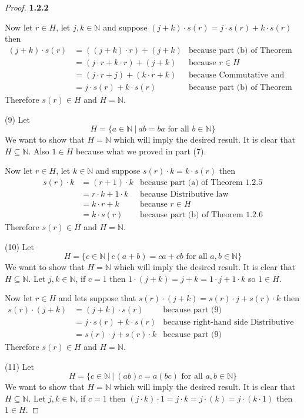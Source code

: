 \documentclass[11pt]{article}
\newcommand{\N}{\mathbb{N}}
\theoremstyle{definition}
\begin{document}
\begin{proof}{\textbf{1.2.2}}
\begin{itemize}
        Now let $r \in H$, let $j,k \in \N$ and suppose
        $(j+k)\cdot s(r) = j\cdot s(r) + k\cdot s(r)$ then
        \begin{align*}
            (j+k)\cdot s(r) &= ((j+k)\cdot r) + (j+k) &\text{because part (b) of Theorem 1.2.6}\\
                &= (j\cdot r + k \cdot r) + (j+k) &\text{because }r \in H\\
                &= (j\cdot r + j) + (k\cdot r + k) &\text{because Commutative and Associative law} \\
                &= j\cdot s(r) + k \cdot s(r) &\text{because part (b) of Theorem 1.2.6}
        \end{align*}
        Therefore $s(r) \in H$ and $H = \N$.
        \end{itemize}
        \item [(9)] Let
        $$H = \{a \in \N ~|~ ab=ba \text{ for all }b \in \N\}$$
        We want to show that $H = \N$ which will imply the desired result. It 
        is clear that $H\subseteq\N$. Also $1 \in H$ because what we proved in
        part (7).

        Now let $r \in H$, let $k \in \N$ and suppose $s(r)\cdot k = k \cdot s(r)$
        then
        \begin{align*}
            s(r) \cdot k &= (r+1) \cdot k & \text{because part (a) of Theorem 1.2.5} \\
                &= r\cdot k + 1\cdot k & \text{because Distributive law} \\
                &= k\cdot r + k & \text{because }r \in H \\
                &= k \cdot s(r) & \text{because part (b) of Theorem 1.2.6}
        \end{align*}
        Therefore $s(r) \in H$ and $H = \N$.
        \item [(10)] Let
        $$H = \{c \in \N ~|~ c(a+b)=ca+cb \text{ for all }a,b \in \N\}$$
        We want to show that $H = \N$ which will imply the desired result. It 
        is clear that $H\subseteq\N$. Let $j,k \in \N$, if $c=1$ then
        $1\cdot(j+k) = j+k = 1\cdot j + 1\cdot k$ so $1 \in H$.

        Now let $r \in H$ and lets suppose that
        $s(r)\cdot(j+k)=s(r)\cdot j + s(r) \cdot k$ then
        \begin{align*}
            s(r)\cdot(j+k) &= (j+k)\cdot s(r) & \text{because part (9)}\\
                &= j\cdot s(r) + k\cdot s(r) & \text{because right-hand side Distributive law}\\
                &= s(r) \cdot j + s(r) \cdot k & \text{because part (9)}
        \end{align*}
        Therefore $s(r) \in H$ and $H = \N$.
\cleardoublepage
        \item [(11)] Let
        $$H = \{c \in \N ~|~ (ab)c=a(bc) \text{ for all }a,b \in \N\}$$
        We want to show that $H = \N$ which will imply the desired result. It 
        is clear that $H\subseteq\N$. Let $j,k \in \N$, if $c = 1$ then
        $(j\cdot k)\cdot 1 = j\cdot k = j\cdot (k) = j\cdot (k\cdot 1)$ then $1 \in H$.
        

\end{proof}
\end{document}
